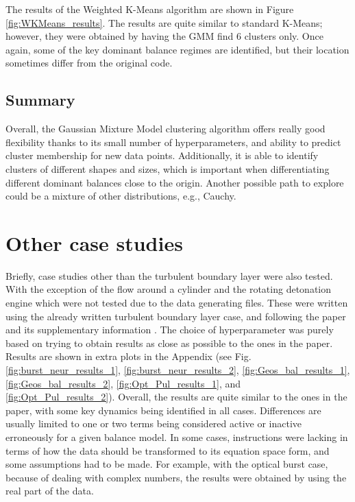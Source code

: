 \documentclass[12pt]{report} %
\begin{document}
The results of the Weighted K-Means algorithm are shown in Figure \ref{fig:WKMeans_results}. The results are quite similar to standard K-Means; however, they were obtained by having the GMM find 6 clusters only. Once again, some of the key dominant balance regimes are identified, but their location sometimes differ from the original code.

\subsection{Summary}

Overall, the Gaussian Mixture Model clustering algorithm offers really good flexibility thanks to its small number of hyperparameters, and ability to predict cluster membership for new data points. Additionally, it is able to identify clusters of different shapes and sizes, which is important when differentiating different dominant balances close to the origin. Another possible path to explore could be a mixture of other distributions, e.g., Cauchy.

\newpage

\section{Other case studies}

Briefly, case studies other than the turbulent boundary layer were also tested. With the exception of the flow around a cylinder and the rotating detonation engine which were not tested due to the data generating files. These were written using the already written turbulent boundary layer case, and following the paper and its supplementary information \cite{callaham2021learning}. The choice of hyperparameter was purely based on trying to obtain results as close as possible to the ones in the paper. Results are shown in extra plots in the Appendix (see Fig. \ref{fig:burst_neur_results_1}, \ref{fig:burst_neur_results_2}, \ref{fig:Geos_bal_results_1}, \ref{fig:Geos_bal_results_2}, \ref{fig:Opt_Pul_results_1}, and \ref{fig:Opt_Pul_results_2}). Overall, the results are quite similar to the ones in the paper, with some key dynamics being identified in all cases. Differences are usually limited to one or two terms being considered active or inactive erroneously for a given balance model. In some cases, instructions were lacking in terms of how the data should be transformed to its equation space form, and some assumptions had to be made. For example, with the optical burst case, because of dealing with complex numbers, the results were obtained by using the real part of the data.
\end{document}
